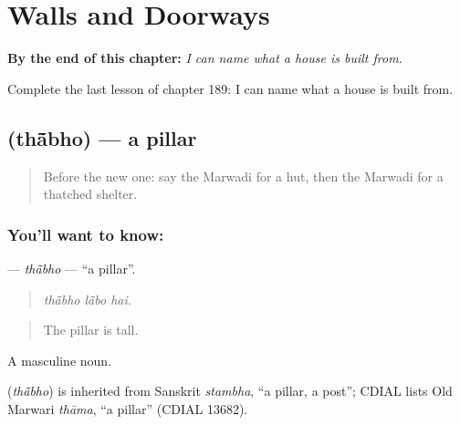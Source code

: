 
\chapter{Walls and Doorways}
\label{ch:mw-walls-and-doorways}

\begin{chapteropening}
\textbf{By the end of this chapter:} \emph{I can name what a house is built from.}

Complete the last lesson of chapter 189: I can name what a house is built from.
\end{chapteropening}

\section[\texorpdfstring{\mw{थांभो} (thā̃bho)}{थांभो (thā̃bho)}]{ (thā̃bho) — a pillar}

\label{lesson:MW-C189-thabho}



\begin{quote}
Before the new one: say the Marwadi for a hut, then the Marwadi for a thatched shelter.
\end{quote}

\subsection*{You'll want to know: }
\textbf{} — \emph{thā̃bho} — \textquotedblleft{}a pillar\textquotedblright{}.

\begin{quote}
  
\end{quote}

\begin{quote}
\emph{thā̃bho lā̃bo hai.}
\end{quote}

\begin{quote}
The pillar is tall.
\end{quote}

A masculine noun.

\begin{cousinweb}
\textbf{} (\emph{thā̃bho}) is inherited from Sanskrit \emph{stambha}, \textquotedblleft{}a pillar, a post\textquotedblright{}; CDIAL lists Old Marwari \emph{thāma}, \textquotedblleft{}a pillar\textquotedblright{} (CDIAL 13682).
\end{cousinweb}


